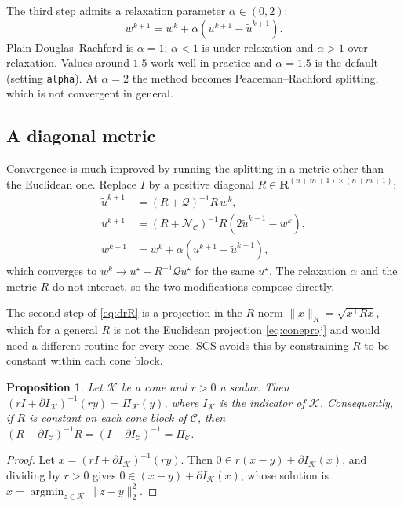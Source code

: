 \documentclass[11pt,a4paper]{article}
\newcommand{\R}{\mathbf{R}}
\newcommand{\K}{\mathcal{K}}
\newcommand{\C}{\mathcal{C}}
\newcommand{\Q}{\mathcal{Q}}
\newcommand{\N}{\mathcal{N}}
\newcommand{\proj}[1]{\Pi_{#1}}
\newcommand{\tr}{^\top}
\theoremstyle{plain}
\newtheorem{proposition}{Proposition}
\begin{document}
The third step admits a relaxation parameter $\alpha \in (0,2)$:
\begin{equation}\label{eq:relax}
w^{k+1} = w^k + \alpha\left(u^{k+1} - \tilde u^{k+1}\right).
\end{equation}
Plain Douglas--Rachford is $\alpha = 1$; $\alpha < 1$ is under-relaxation and
$\alpha > 1$ over-relaxation. Values around $1.5$ work well in practice and
$\alpha = 1.5$ is the default (setting \texttt{alpha}). At $\alpha = 2$ the
method becomes Peaceman--Rachford splitting, which is not convergent in
general.

\subsection{A diagonal metric}\label{sec:metric}

Convergence is much improved by running the splitting in a metric other than
the Euclidean one. Replace $I$ by a positive diagonal
$R \in \R^{(n+m+1)\times(n+m+1)}$:
\begin{align}\label{eq:drR}
\tilde u^{k+1} &= (R + \Q)^{-1} R\, w^k, \nonumber\\
u^{k+1} &= (R + \N_\C)^{-1} R \left(2\tilde u^{k+1} - w^k\right), \\
w^{k+1} &= w^k + \alpha\left(u^{k+1} - \tilde u^{k+1}\right), \nonumber
\end{align}
which converges to $w^k \to u^\star + R^{-1}\Q u^\star$ for the same
$u^\star$. The relaxation $\alpha$ and the metric $R$ do not interact, so the
two modifications compose directly.

The second step of \eqref{eq:drR} is a projection in the $R$-norm
$\|x\|_R = \sqrt{x\tr R x}$, which for a general $R$ is not the Euclidean
projection \eqref{eq:coneproj} and would need a different routine for every
cone. SCS avoids this by constraining $R$ to be constant within each cone
block.

\begin{proposition}\label{prop:metric}
Let $\K$ be a cone and $r > 0$ a scalar. Then
$(rI + \partial I_\K)^{-1}(r y) = \proj{\K}(y)$, where $I_\K$ is the indicator
of $\K$. Consequently, if $R$ is constant on each cone block of $\C$, then
$(R + \partial I_\C)^{-1} R = (I + \partial I_\C)^{-1} = \proj{\C}$.
\end{proposition}

\begin{proof}
Let $x = (rI + \partial I_\K)^{-1}(ry)$. Then
$0 \in r(x - y) + \partial I_\K(x)$, and dividing by $r > 0$ gives
$0 \in (x - y) + \partial I_\K(x)$, whose solution is
$x = \operatorname*{argmin}_{z\in\K}\|z-y\|_2^2$.
\end{proof}
\end{document}
